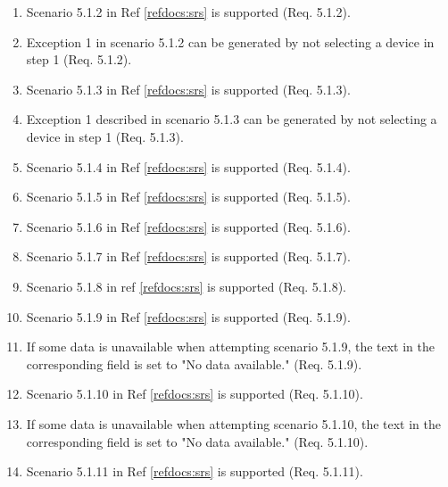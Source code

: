 \documentclass[a4paper]{article}
\newlength{\testlabellength}
\newenvironment{testlist}{\begin{enumerate}[label=\bfseries Test \thesubsection.\arabic* , labelindent=0pt, labelwidth=\testlabellength , leftmargin=2cm]}{\end{enumerate}}
\begin{document}
\begin{appendices}
\begin{testlist}
	\item Scenario 5.1.2 in Ref \ref{refdocs:srs} is supported (Req. 5.1.2).
	
	\item Exception 1 in scenario 5.1.2 can be generated by not selecting a device in step 1 (Req. 5.1.2).
	
	\item Scenario 5.1.3 in Ref \ref{refdocs:srs} is supported (Req. 5.1.3).
	
	\item Exception 1 described in scenario 5.1.3 can be generated by not selecting a device in step 1 (Req. 5.1.3). 
	
	\item Scenario 5.1.4 in Ref \ref{refdocs:srs} is supported (Req. 5.1.4).
	
	\item Scenario 5.1.5 in Ref \ref{refdocs:srs} is supported (Req. 5.1.5).
	
	\item Scenario 5.1.6 in Ref \ref{refdocs:srs} is supported (Req. 5.1.6).
	
	\item Scenario 5.1.7 in Ref \ref{refdocs:srs} is supported (Req. 5.1.7).
	
	\item Scenario 5.1.8 in ref \ref{refdocs:srs} is supported (Req. 5.1.8).
	
	
	\item Scenario 5.1.9 in Ref \ref{refdocs:srs} is supported (Req. 5.1.9).
	
	\item If some data is unavailable when attempting scenario 5.1.9, the text in the corresponding field is set to "No data available." (Req. 5.1.9).
	
	\item Scenario 5.1.10 in Ref \ref{refdocs:srs} is supported (Req. 5.1.10).
	
	\item If some data is unavailable when attempting scenario 5.1.10, the text in the corresponding field is set to "No data available." (Req. 5.1.10).
	
	\item Scenario 5.1.11 in Ref \ref{refdocs:srs} is supported (Req. 5.1.11).
	

\end{testlist}
\end{appendices}
\end{document}
